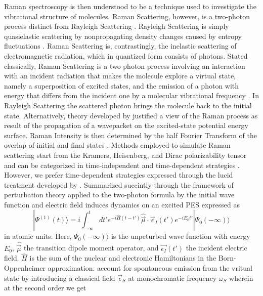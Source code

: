 \documentclass[10pt]{article}
\begin{document}
Raman spectroscopy is then understood to be a technique used to investigate the vibrational structure of molecules. Raman Scattering, however, is a two-photon process distinct from Rayleigh Scattering \citep{herman2003raman}. Rayleigh Scattering is simply quasielastic scattering by nonpropagating density changes caused by entropy fluctuations \citep{herman2003raman}. Raman Scattering is, contrastingly, the inelastic scattering of electromagnetic radiation, which in quantized form consists of photons. Stated classically, Raman Scattering is a two photon process involving an interaction with an incident radiation that makes the molecule explore a virtual state, namely a superposition of excited states, and the emission of a photon with energy that differs from the incident one by a molecular vibrational frequency \citep{dall2022time}. In Rayleigh Scattering the scattered photon brings the molecule back to the initial state. Alternatively, theory developed by \citet{lee1979time} justified a view of the Raman process as result of the propagation of a wavepacket on the excited-state potential energy surface. Raman Intensity is then determined by the half Fourier Transform of the overlap of initial and final states \citep{lee1979time, heller1982simple}. Methods employed to simulate Raman scattering start from the Kramers, Heisenberg, and Dirac polarizability tensor and can be categorized in time-independent and time-dependent strategies \citep{kramers1925streuung,dall2022time}. However, we prefer time-dependent strategies expressed through the lucid treatment developed by \citet{dall2022time}. Summarized succintly through the framework of perturbation theory applied to the two-photon formula by \citet{dall2022time} the initial wave function and electric field induces dynamics on an excited PES expressed as
\begin{equation}
| \Psi^{(1)}(t)\rangle = i \int_{-\infty}^t dt' e^{-i\hat{H}(t-t')}\hat{\vec{\mu}} \cdot \vec{\epsilon}_{I}(t') e^{-iE_0t'}| \Psi_0(-\infty)\rangle 
\end{equation}
in atomic units. Here, $\Psi_0(-\infty)\rangle$ is the unpeturbed wave function with energy $E_0$, $\hat{\vec{\mu}}$ the transition dipole moment operator, and $\vec{\epsilon_{I}}(t')$ the incident electric field. $\hat{H}$ is the sum of the nuclear and electronic Hamiltonians in the Born-Oppenheimer approximation. \citet{dall2022time} account for spontaneous emission from the vritual state by introducing a classical field $\vec{\epsilon}_S$ at monochromatic frequency $\omega_S$ wherein at the second order we get 
\end{document}
